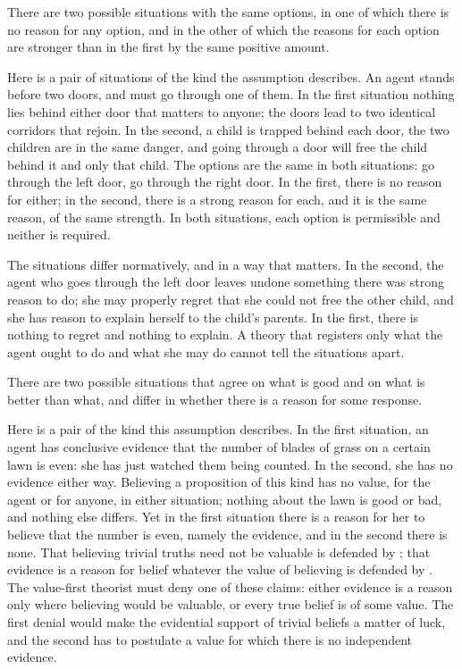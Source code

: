 \documentclass{situationist-preprint}
\begin{document}
\begin{assumption}\label{a:doors}
There are two possible situations with the same options, in one of which there is no reason for any option, and in the other of which the reasons for each option are stronger than in the first by the same positive amount.
\end{assumption}

Here is a pair of situations of the kind the assumption describes. An agent stands before two doors, and must go through one of them. In the first situation nothing lies behind either door that matters to anyone; the doors lead to two identical corridors that rejoin. In the second, a child is trapped behind each door, the two children are in the same danger, and going through a door will free the child behind it and only that child. The options are the same in both situations: go through the left door, go through the right door. In the first, there is no reason for either; in the second, there is a strong reason for each, and it is the same reason, of the same strength. In both situations, each option is permissible and neither is required.

The situations differ normatively, and in a way that matters. In the second, the agent who goes through the left door leaves undone something there was strong reason to do; she may properly regret that she could not free the other child, and she has reason to explain herself to the child's parents. In the first, there is nothing to regret and nothing to explain. A theory that registers only what the agent ought to do and what she may do cannot tell the situations apart.

\begin{assumption}\label{a:trivial}
There are two possible situations that agree on what is good and on what is better than what, and differ in whether there is a reason for some response.
\end{assumption}

Here is a pair of the kind this assumption describes. In the first situation, an agent has conclusive evidence that the number of blades of grass on a certain lawn is even: she has just watched them being counted. In the second, she has no evidence either way. Believing a proposition of this kind has no value, for the agent or for anyone, in either situation; nothing about the lawn is good or bad, and nothing else differs. Yet in the first situation there is a reason for her to believe that the number is even, namely the evidence, and in the second there is none. That believing trivial truths need not be valuable is defended by \citet{Kelly2003}; that evidence is a reason for belief whatever the value of believing is defended by \citet{Shah2006}. The value-first theorist must deny one of these claims: either evidence is a reason only where believing would be valuable, or every true belief is of some value. The first denial would make the evidential support of trivial beliefs a matter of luck, and the second has to postulate a value for which there is no independent evidence.
\end{document}
